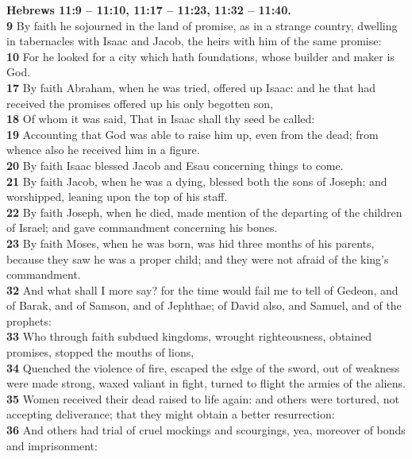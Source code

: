 \documentclass[10pt]{article} %
\begin{document}
{\begin{minipage}[t]{0.45\textwidth}
\textbf{Hebrews 11:9 -- 11:10, 11:17 -- 11:23, 11:32 -- 11:40.}\\
\textbf{\scriptsize 9} By faith he sojourned in the land of promise, as in a strange country, dwelling in tabernacles with Isaac and Jacob, the heirs with him of the same promise:\\
\textbf{\scriptsize 10} For he looked for a city which hath foundations, whose builder and maker is God.\\
\textbf{\scriptsize 17} By faith Abraham, when he was tried, offered up Isaac: and he that had received the promises offered up his only begotten son,\\
\textbf{\scriptsize 18} Of whom it was said, That in Isaac shall thy seed be called:\\
\textbf{\scriptsize 19} Accounting that God was able to raise him up, even from the dead; from whence also he received him in a figure.\\
\textbf{\scriptsize 20} By faith Isaac blessed Jacob and Esau concerning things to come.\\
\textbf{\scriptsize 21} By faith Jacob, when he was a dying, blessed both the sons of Joseph; and worshipped, leaning upon the top of his staff.\\
\textbf{\scriptsize 22} By faith Joseph, when he died, made mention of the departing of the children of Israel; and gave commandment concerning his bones.\\
\textbf{\scriptsize 23} By faith Moses, when he was born, was hid three months of his parents, because they saw he was a proper child; and they were not afraid of the king's commandment.\\
\textbf{\scriptsize 32} And what shall I more say? for the time would fail me to tell of Gedeon, and of Barak, and of Samson, and of Jephthae; of David also, and Samuel, and of the prophets:\\
\textbf{\scriptsize 33} Who through faith subdued kingdoms, wrought righteousness, obtained promises, stopped the mouths of lions,\\
\textbf{\scriptsize 34} Quenched the violence of fire, escaped the edge of the sword, out of weakness were made strong, waxed valiant in fight, turned to flight the armies of the aliens.\\
\textbf{\scriptsize 35} Women received their dead raised to life again: and others were tortured, not accepting deliverance; that they might obtain a better resurrection:\\
\textbf{\scriptsize 36} And others had trial of cruel mockings and scourgings, yea, moreover of bonds and imprisonment:\\

\end{minipage}}
\end{document}
